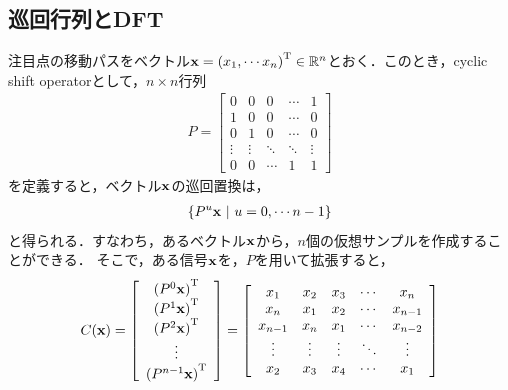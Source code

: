 \documentclass[11pt,a4j]{jarticle}
\begin{document}
    \subsection{巡回行列とDFT}
      注目点の移動パスをベクトル${\bf x} = {(x_1, \cdots x_n)}^{\mathrm{T}} \in \mathbb{R}^{n}$とおく．このとき，cyclic shift operatorとして，$n \times n$行列
      \begin{align}
        P = 
        \left[
          \begin{array}{ccccc}
            0 & 0 & 0 & \cdots & 1 \\
            1 & 0 & 0 & \cdots & 0 \\
            0 & 1 & 0 & \cdots & 0 \\
            \vdots&\vdots&\ddots&\ddots&\vdots \\
            0 & 0 & \cdots & 1 & 1
          \end{array}
        \right]
      \end{align}
      を定義すると，ベクトル${\bf x}$の巡回置換は，
      \begin{align}
        \left\{ {P}^{u}{\bf x} ~|~ u=0,\cdots n-1 \right\}
      \end{align}
      と得られる．すなわち，あるベクトル$\bf x$から，$n$個の仮想サンプルを作成することができる．
      そこで，ある信号$\bf x$を，$P$を用いて拡張すると，
      \begin{align}
        C({\bf x}) = 
        \left[
          \begin{array}{c}
            {({P}^{0} {\bf x})}^{\mathrm{T}} \\
            {({P}^{1} {\bf x})}^{\mathrm{T}} \\
            {({P}^{2} {\bf x})}^{\mathrm{T}} \\
            \vdots \\
            {({P}^{n-1} {\bf x})}^{\mathrm{T}} 
          \end{array}
        \right]
        = 
        \left[
          \begin{array}{ccccc}
            x_1 & x_2 & x_3 & \cdots & x_n \\
            x_n & x_1 & x_2 & \cdots & x_{n-1} \\
            x_{n-1} & x_n & x_1 & \cdots & x_{n-2} \\
            \vdots&\vdots&\vdots&\ddots&\vdots \\
            x_2 & x_3 & x_4 & \cdots  & x_1
          \end{array}
        \right]
      \end{align}
\end{document}
